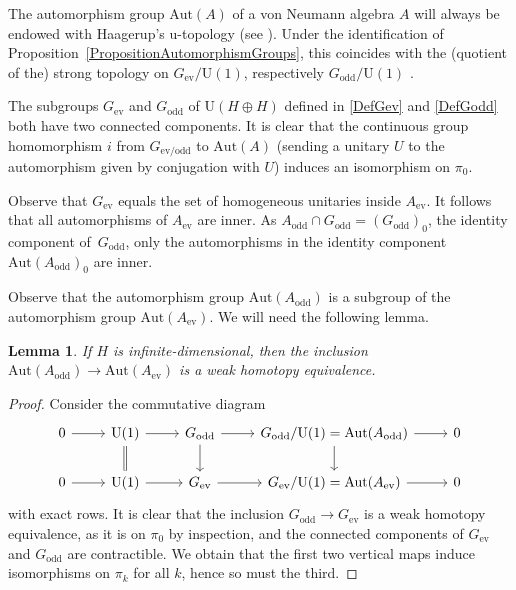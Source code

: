 \documentclass[pdftex]{sigma}
\numberwithin{equation}{section}
\newtheorem{Lemma}[Theorem]{Lemma}
\newcommand{\Aut}{\mathrm{Aut}}
\newcommand{\U}{\mathrm{U}}
\begin{document}
The automorphism group $\Aut(A)$ of a von Neumann algebra $A$ will always be endowed with Haagerup's u-topology (see \cite[Section~3]{HaagerupStandardForm}).
Under the identification of Proposition~\ref{PropositionAutomorphismGroups}, this coincides with the (quotient of the) strong topology on $G_{\mathrm{ev}}/\U(1)$, respectively $G_{\mathrm{odd}}/\U(1)$ \cite[Corollary~3.8]{HaagerupStandardForm}.

\begin{Remark} \label{RemarkComponentsAutA}
The subgroups $G_{\mathrm{ev}}$ and $G_{\mathrm{odd}}$ of $\U(H \oplus H)$ defined in \eqref{DefGev} and \eqref{DefGodd} both have two connected components.
It is clear that the continuous group homomorphism $i$ from $G_{\mathrm{ev}/\mathrm{odd}}$ to $\Aut(A)$ (sending a unitary $U$ to the automorphism given by conjugation with $U$) induces an isomorphism on $\pi_0$.
\end{Remark}

\begin{Remark}
Observe that $G_{\mathrm{ev}}$ equals the set of homogeneous unitaries inside $A_{\mathrm{ev}}$.
It follows that all automorphisms of $A_{\mathrm{ev}}$ are inner.
As $A_{\mathrm{odd}} \cap G_{\mathrm{odd}} = (G_{\mathrm{odd}})_0$, the identity component of~$G_{\mathrm{odd}}$, only the automorphisms in the identity component $\Aut(A_{\mathrm{odd}})_0$ are inner.
\end{Remark}

Observe that the automorphism group $\Aut(A_{\mathrm{odd}})$ is a subgroup of the automorphism group $\Aut(A_{\mathrm{ev}})$.
We will need the following lemma.

\begin{Lemma} \label{WeakHomotopyEquivalence}
If $H$ is infinite-dimensional, then the inclusion $\Aut(A_{\mathrm{odd}}) \to \Aut(A_{\mathrm{ev}})$ is a weak homotopy equivalence.
\end{Lemma}

\begin{proof}
Consider the commutative diagram
\begin{equation*}
\begin{tikzcd}
 0 \ar[r] & \U(1) \ar[r] \ar[d, equal] & G_{\mathrm{odd}} \ar[d] \ar[r] & G_{\mathrm{odd}}/\U(1) = \Aut(A_{\mathrm{odd}})\ar[r] \ar[d] & 0 \\
 0 \ar[r] & \U(1) \ar[r] & G_{\mathrm{ev}} \ar[r] & G_{\mathrm{ev}}/\U(1) = \Aut(A_{\mathrm{ev}}) \ar[r] & 0
\end{tikzcd}
\end{equation*}
with exact rows.
It is clear that the inclusion $G_{\mathrm{odd}} \to G_{\mathrm{ev}}$ is a weak homotopy equivalence, as it is on $\pi_0$ by inspection, and the connected components of $G_{\mathrm{ev}}$ and $G_{\mathrm{odd}}$ are contractible.
We obtain that the first two vertical maps induce isomorphisms on $\pi_k$ for all $k$, hence so must the third.
\end{proof}
\end{document}
